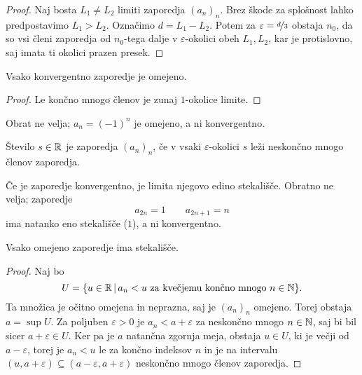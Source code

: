 \begin{proof}
  Naj bosta $L_1 \ne L_2$ limiti zaporedja $(a_n)_n$.
  Brez škode za splošnost lahko predpostavimo $L_1 > L_2$.
  Označimo $d = L_1 - L_2$.
  Potem za $\varepsilon = \nicefrac{d}{3}$ obstaja $n_0$, da so vsi členi
  zaporedja od $n_0$-tega dalje v $\varepsilon$-okolici obeh $L_1, L_2$, kar je
  protislovno, saj imata ti okolici prazen presek.
\end{proof}

\begin{trditev}
  \label{trditev:konvergentno-implicira-omejeno}
  Vsako konvergentno zaporedje je omejeno.
\end{trditev}

\begin{proof}
  Le končno mnogo členov je zunaj $1$-okolice limite.
\end{proof}

\begin{primer}
  Obrat ne velja; $a_n = (-1)^n$ je omejeno, a ni konvergentno.
\end{primer}

\begin{definicija}
  Število $s \in \mathbb{R}$ je  zaporedja $(a_n)_n$, če v vsaki
  $\varepsilon$-okolici $s$ leži neskončno mnogo členov zaporedja.
\end{definicija}

Če je zaporedje konvergentno, je limita njegovo edino stekališče.
Obratno ne velja; zaporedje
\[
  a_{2n} = 1 \qquad a_{2n+1} = n
\]
ima natanko eno stekališče ($1$), a ni konvergentno.

\begin{izrek}
  Vsako omejeno zaporedje ima stekališče.
\end{izrek}

\begin{proof}
  Naj bo
  \[
	U = \{ u \in \mathbb{R} \,|\, \text{$a_n < u$ za kvečjemu končno mnogo $n \in \mathbb{N}$}
	\}.
  \]
  Ta množica je očitno omejena in neprazna, saj je $(a_n)_n$ omejeno.
  Torej obstaja $a = \sup U$.
  Za poljuben $\varepsilon > 0$ je $a_n < a + \varepsilon$ za neskončno mnogo $n
  \in \mathbb{N}$, saj bi bil sicer $a + \varepsilon \in U$.
  Ker pa je $a$ natančna zgornja meja, obstaja $u \in U$, ki je večji od $a -
  \varepsilon$, torej je $a_n < u$ le za končno indeksov $n$ in je na intervalu
  $(u, a + \varepsilon) \subseteq (a-\varepsilon, a+\varepsilon)$ neskončno
  mnogo členov zaporedja.
\end{proof}

